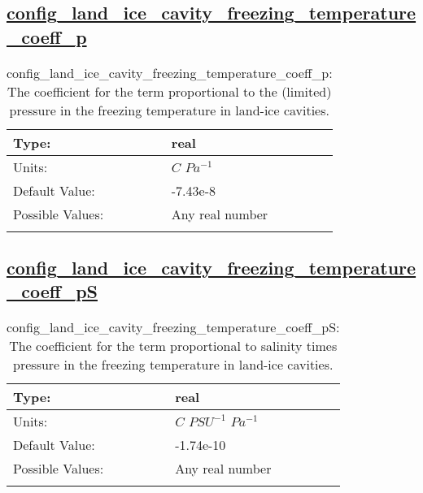 \subsection[config\_land\_ice\_cavity\_freezing\_temperature\_coeff\_p]{\hyperref[sec:nm_tab_eos]{config\_land\_ice\_cavity\_freezing\_temperature\_coeff\_p}}
\label{subsec:nm_sec_config_land_ice_cavity_freezing_temperature_coeff_p}
\begin{center}
\begin{longtable}{| p{2.0in} || p{4.0in} |}
    \hline
    Type: & real \\
    \hline
    Units: & $C$ $Pa^{-1}$ \\
    \hline
    Default Value: & -7.43e-8 \\
    \hline
    Possible Values: & Any real number \\
    \hline
    \caption{config\_land\_ice\_cavity\_freezing\_temperature\_coeff\_p: The coefficient for the term proportional to the (limited) pressure in the freezing temperature in land-ice cavities.}
\end{longtable}
\end{center}
\subsection[config\_land\_ice\_cavity\_freezing\_temperature\_coeff\_pS]{\hyperref[sec:nm_tab_eos]{config\_land\_ice\_cavity\_freezing\_temperature\_coeff\_pS}}
\label{subsec:nm_sec_config_land_ice_cavity_freezing_temperature_coeff_pS}
\begin{center}
\begin{longtable}{| p{2.0in} || p{4.0in} |}
    \hline
    Type: & real \\
    \hline
    Units: & $C$ $PSU^{-1}$ $Pa^{-1}$ \\
    \hline
    Default Value: & -1.74e-10 \\
    \hline
    Possible Values: & Any real number \\
    \hline
    \caption{config\_land\_ice\_cavity\_freezing\_temperature\_coeff\_pS: The coefficient for the term proportional to salinity times pressure in the freezing temperature in land-ice cavities.}
\end{longtable}
\end{center}
